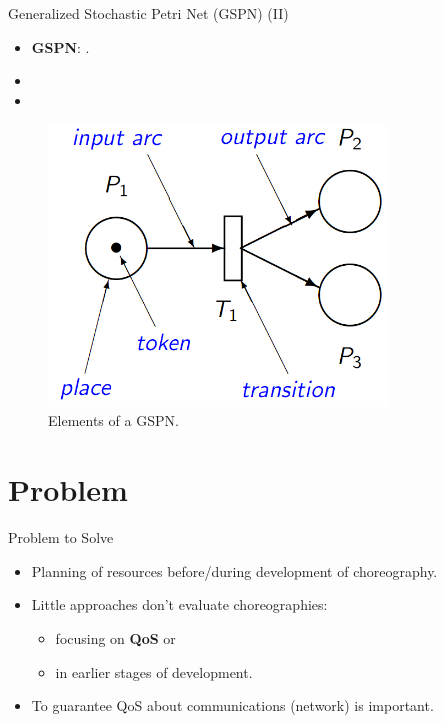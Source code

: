 \documentclass[xcolor=svgnames]{beamer}
\begin{document}
  \begin{frame}{ Generalized Stochastic Petri Net (GSPN) (II)}
    \begin{itemize}
	  \item \textbf{GSPN}: .	
	  \item
	  \item
	\end{itemize}

    \begin{figure}[!h]
	      \centering
	      \includegraphics[width=0.8\textwidth]{petrinet.png}
	      \caption{Elements of a GSPN.}
      \end{figure}	    
  \end{frame}
\section{Problem}


    \begin{frame}{Problem to Solve}
    	\begin{itemize}
          \item <1-> Planning of resources before/during development of choreography.
          \item <2-> Little approaches don't evaluate choreographies:
	    \begin{itemize}
	      \item focusing on \textbf{QoS} or
	      \item in earlier stages of development.
	    \end{itemize}
          \item <3-> To guarantee QoS about communications (network) is important.
    	\end{itemize}
    \end{frame}
\end{document}
